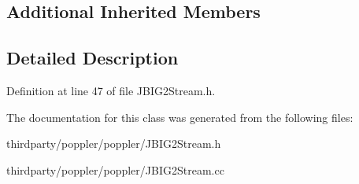 \subsection*{Additional Inherited Members}


\subsection{Detailed Description}


Definition at line 47 of file J\+B\+I\+G2\+Stream.\+h.



The documentation for this class was generated from the following files\+:\begin{DoxyCompactItemize}
\item 
thirdparty/poppler/poppler/J\+B\+I\+G2\+Stream.\+h\item 
thirdparty/poppler/poppler/J\+B\+I\+G2\+Stream.\+cc\end{DoxyCompactItemize}
